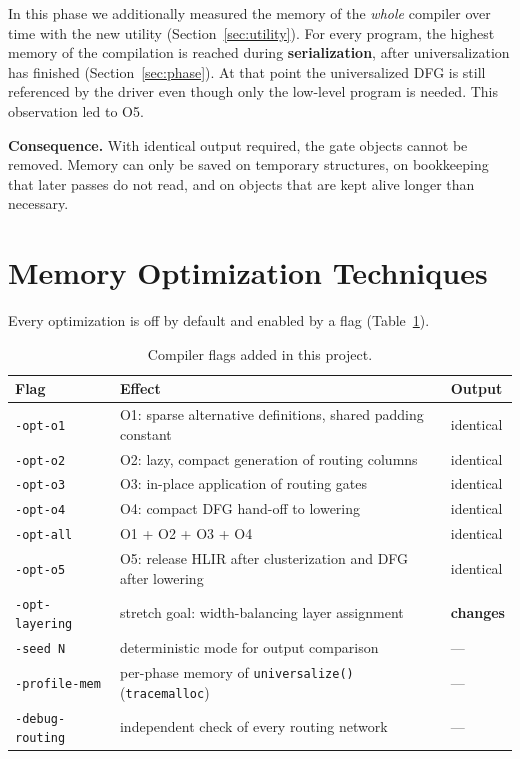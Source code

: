 \documentclass[12pt,a4paper,oneside]{report}
\newcommand{\code}[1]{\texttt{#1}}
\begin{document}
In this phase we additionally measured the memory of the \emph{whole} compiler over time with the
new utility (Section~\ref{sec:utility}). For every program, the highest memory of the compilation
is reached during \textbf{serialization}, after universalization has finished
(Section~\ref{sec:phase}). At that point the universalized DFG is still referenced by the driver
even though only the low-level program is needed. This observation led to O5.

\textbf{Consequence.} With identical output required, the gate objects cannot be removed. Memory
can only be saved on temporary structures, on bookkeeping that later passes do not read, and on
objects that are kept alive longer than necessary.

\section{Memory Optimization Techniques}
\label{sec:opts}
Every optimization is off by default and enabled by a flag (Table~\ref{tab:flags}).

\begin{table}[H]
\centering\small
\caption{Compiler flags added in this project.}
\label{tab:flags}
\begin{tabularx}{\textwidth}{@{}l X l@{}}
\toprule
Flag & Effect & Output\\ \midrule
\code{-opt-o1} & O1: sparse alternative definitions, shared padding constant & identical\\
\code{-opt-o2} & O2: lazy, compact generation of routing columns & identical\\
\code{-opt-o3} & O3: in-place application of routing gates & identical\\
\code{-opt-o4} & O4: compact DFG hand-off to lowering & identical\\
\code{-opt-all} & O1 + O2 + O3 + O4 & identical\\
\code{-opt-o5} & O5: release HLIR after clusterization and DFG after lowering & identical\\
\code{-opt-layering} & stretch goal: width-balancing layer assignment & \textbf{changes}\\
\code{-seed N} & deterministic mode for output comparison & ---\\
\code{-profile-mem} & per-phase memory of \code{universalize()} (\code{tracemalloc}) & ---\\
\code{-debug-routing} & independent check of every routing network & ---\\
\bottomrule
\end{tabularx}
\end{table}
\end{document}
